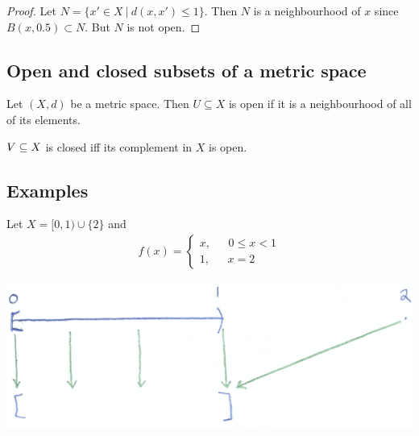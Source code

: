 \begin{proof}
  Let $N = \{x' \in X ~|~ d(x, x') \leq 1\}$. Then $N$ is a neighbourhood of $x$ since
  $B(x, 0.5) \subset N$. But $N$ is not open.
\end{proof}





\subsection{Open and closed subsets of a metric space}
\begin{definition}
  Let $(X, d)$ be a metric space. Then $U \subseteq X$ is open if it is a neighbourhood of all of
  its elements.

  $V \subseteq X$ is closed iff its complement in $X$ is open.
\end{definition}


\subsection{Examples}


Let $X = [0, 1) \cup \{2\}$ and
\begin{align*}
f(x) =
\begin{cases}
  x, ~~~~~~~ 0 \le x < 1 \\
  1, ~~~~~~~ x = 2
\end{cases}
\end{align*}


\includegraphics[width=400pt]{img/analysis--real-analysis--examples-083a.png}

